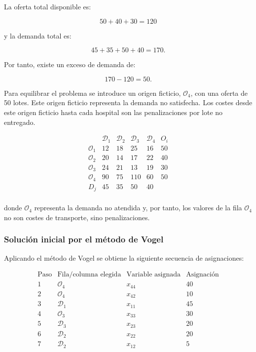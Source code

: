 La oferta total disponible es:

\[
50+40+30=120
\]

y la demanda total es:

\[
45+35+50+40=170.
\]

Por tanto, existe un exceso de demanda de:

\[
170-120=50.
\]

Para equilibrar el problema se introduce un origen ficticio, $\mathcal{O}_4$, con una oferta de 50 lotes. Este origen ficticio representa la demanda no satisfecha. Los costes desde este origen ficticio hasta cada hospital son las penalizaciones por lote no entregado.

\[
\begin{array}{c|cccc|c}
 & \mathcal{D}_1 & \mathcal{D}_2 & \mathcal{D}_3 & \mathcal{D}_4 & O_i \\
\hline
\mathcal{O}_1 & 12 & 18 & 25 & 16 & 50 \\
\mathcal{O}_2 & 20 & 14 & 17 & 22 & 40 \\
\mathcal{O}_3 & 24 & 21 & 13 & 19 & 30 \\
\mathcal{O}_4 & 90 & 75 & 110 & 60 & 50 \\
\hline
D_j & 45 & 35 & 50 & 40 & \\
\end{array}
\]

donde $\mathcal{O}_4$ representa la demanda no atendida y, por tanto, los valores de la fila $\mathcal{O}_4$ no son costes de transporte, sino penalizaciones.

\subsubsection*{Solución inicial por el método de Vogel}

Aplicando el método de Vogel se obtiene la siguiente secuencia de asignaciones:

\[
\begin{array}{c|c|c|c}
\text{Paso} & \text{Fila/columna elegida} & \text{Variable asignada} & \text{Asignación} \\
\hline
1 & \mathcal{O}_4 & x_{44} & 40 \\
2 & \mathcal{O}_4 & x_{42} & 10 \\
3 & \mathcal{D}_1 & x_{11} & 45 \\
4 & \mathcal{O}_3 & x_{33} & 30 \\
5 & \mathcal{D}_3 & x_{23} & 20 \\
6 & \mathcal{D}_2 & x_{22} & 20 \\
7 & \mathcal{D}_2 & x_{12} & 5 \\
\end{array}
\]

